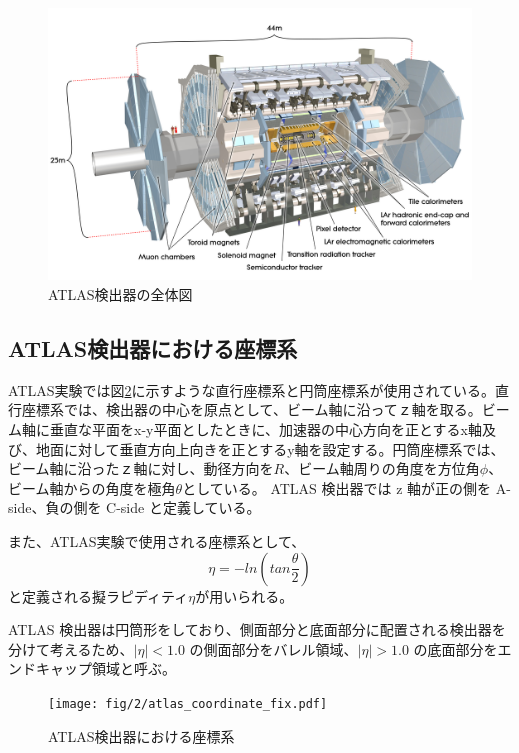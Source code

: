 \begin{figure}[tb]
  \centering
  \includegraphics[clip,width=14cm]{fig/2/0803012_01.jpg}
  \caption{ATLAS検出器の全体図}
  \label{fig:ATLAS検出器}
\end{figure}

\subsection{ATLAS検出器における座標系}
ATLAS実験では図\ref{fig:a}に示すような直行座標系と円筒座標系が使用されている。直行座標系では、検出器の中心を原点として、ビーム軸に沿ってｚ軸を取る。ビーム軸に垂直な平面をx-y平面としたときに、加速器の中心方向を正とするx軸及び、地面に対して垂直方向上向きを正とするy軸を設定する。円筒座標系では、ビーム軸に沿ったｚ軸に対し、動径方向を$R$、ビーム軸周りの角度を方位角$\phi$、ビーム軸からの角度を極角$\theta$としている。
ATLAS 検出器では z 軸が正の側を A-side、負の側を C-side と定義している。

また、ATLAS実験で使用される座標系として、
\begin{equation}
　\eta=-ln(tan\frac{\theta}{2})
　\label{ラピディティ}
\end{equation}
と定義される擬ラピディティ$\eta$が用いられる。

ATLAS 検出器は円筒形をしており、側面部分と底面部分に配置される検出器を分けて考えるため、$|\eta| < 1.0$ の側面部分をバレル領域、$|\eta| > 1.0$ の底面部分をエンドキャップ領域と呼ぶ。

\begin{figure}[tb]
  \centering
  \texttt{[image: fig/2/atlas\_coordinate\_fix.pdf]}
  \caption{ATLAS検出器における座標系}
  \label{fig:a}
\end{figure}


